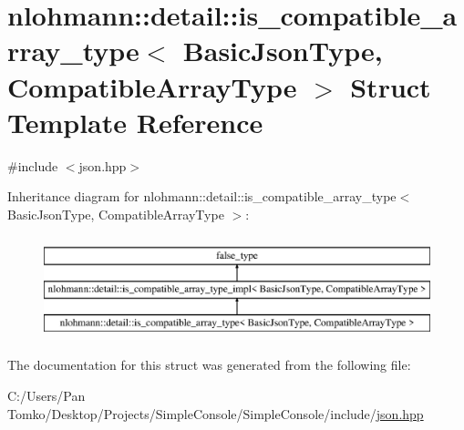 \hypertarget{structnlohmann_1_1detail_1_1is__compatible__array__type}{}\section{nlohmann\+::detail\+::is\+\_\+compatible\+\_\+array\+\_\+type$<$ Basic\+Json\+Type, Compatible\+Array\+Type $>$ Struct Template Reference}
\label{structnlohmann_1_1detail_1_1is__compatible__array__type}


{\ttfamily \#include $<$json.\+hpp$>$}

Inheritance diagram for nlohmann\+::detail\+::is\+\_\+compatible\+\_\+array\+\_\+type$<$ Basic\+Json\+Type, Compatible\+Array\+Type $>$\+:\begin{figure}[H]
\begin{center}
\leavevmode
\includegraphics[height=3.000000cm]{d8/d94/structnlohmann_1_1detail_1_1is__compatible__array__type}
\end{center}
\end{figure}


The documentation for this struct was generated from the following file\+:\begin{DoxyCompactItemize}
\item 
C\+:/\+Users/\+Pan Tomko/\+Desktop/\+Projects/\+Simple\+Console/\+Simple\+Console/include/\mbox{\hyperlink{json_8hpp}{json.\+hpp}}\end{DoxyCompactItemize}
